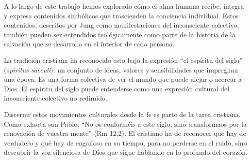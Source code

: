 \documentclass[12pt]{article}
\begin{document}
A lo largo de este trabajo hemos explorado cómo el alma humana recibe, integra y expresa contenidos simbólicos que trascienden la conciencia individual. Estos contenidos, descritos por Jung como manifestaciones del inconsciente colectivo, también pueden ser entendidos teológicamente como parte de la historia de la salvación que se desarrolla en el interior de cada persona.

La tradición cristiana ha reconocido esto bajo la expresión “el espíritu del siglo” (\textit{spiritus saeculi}): un conjunto de ideas, valores y sensibilidades que impregnan una época. Es una forma colectiva de ver el mundo que puede alejar o acercar a Dios. El espíritu del siglo puede entenderse como una expresión cultural del inconsciente colectivo no redimido.

Discernir estos movimientos culturales desde la fe es parte de la tarea cristiana. Como exhorta san Pablo: “No os conforméis a este siglo, sino transformaos por la renovación de vuestra mente” (Rm 12,2). El cristiano ha de reconocer qué hay de verdadero y qué hay de engañoso en su tiempo, para no perderse en el ruido, sino descubrir la voz silenciosa de Dios que sigue hablando en lo profundo del corazón.
\end{document}

